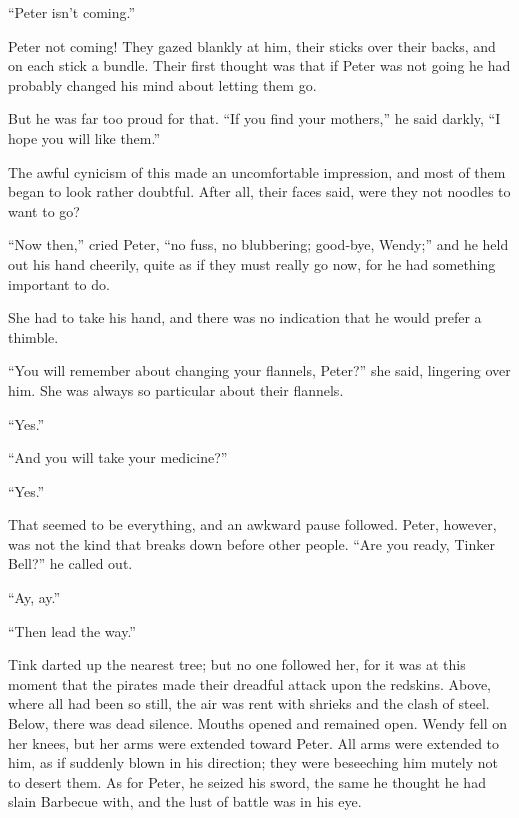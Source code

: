 “Peter isn’t coming.”

Peter not coming!
They gazed blankly at him, their sticks over their backs, and on each stick a bundle.
Their first thought was that if Peter was not going he had probably changed his mind about letting them go.

But he was far too proud for that.
“If you find your mothers,” he said darkly, “I hope you will like them.”

The awful cynicism of this made an uncomfortable impression,
and most of them began to look rather doubtful.
After all, their faces said, were they not noodles to want to go?

“Now then,” cried Peter, “no fuss, no blubbering;
good‐bye, Wendy;”
and he held out his hand cheerily,
quite as if they must really go now, for he had something important to do.

She had to take his hand, and there was no indication that he would prefer a thimble.

“You will remember about changing your flannels, Peter?\@” she said, lingering over him.
She was always so particular about their flannels.

“Yes.”

“And you will take your medicine?”

“Yes.”

That seemed to be everything, and an awkward pause followed.
Peter, however, was not the kind that breaks down before other people.
“Are you ready, Tinker Bell?\@” he called out.

“Ay, ay.”

“Then lead the way.”

Tink darted up the nearest tree;
but no one followed her, for it was at this moment that the pirates made their dreadful attack upon the redskins.
Above, where all had been so still, the air was rent with shrieks and the clash of steel.
Below, there was dead silence.
Mouths opened and remained open.
Wendy fell on her knees, but her arms were extended toward Peter.
All arms were extended to him, as if suddenly blown in his direction;
they were beseeching him mutely not to desert them.
As for Peter, he seized his sword, the same he thought he had slain Barbecue with,
and the lust of battle was in his eye.

\endinput
